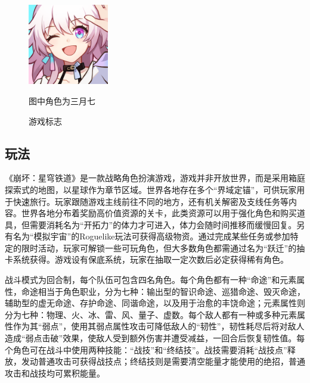 \begin{figure}
    \centering
    \includegraphics[width=100pt]{docs/imgs/HSR}


    \vspace{-8pt}
    \fontSimsun\sizeFivel 图中角色为三月七
    \vspace{-8pt}
    \caption{游戏标志}
    \label{fig:figure1}
\end{figure}

\subsection{玩法}

《崩坏：星穹铁道》是一款战略角色扮演游戏，游戏并非开放世界，而是采用箱庭探索式的地图，以星球作为章节区域。世界各地存在多个“界域定锚”，可供玩家用于快速旅行。玩家跟随游戏主线前往不同的地方，还有机关解密及支线任务等内容。世界各地分布着奖励高价值资源的关卡，此类资源可以用于强化角色和购买道具，但需要消耗名为“开拓力”的体力才可进入，体力会随时间推移而缓慢回复。另有名为“模拟宇宙”的Roguelike玩法可获得高级物资。通过完成某些任务或参加特定的限时活动，玩家可解锁一些可玩角色，但大多数角色都需通过名为“跃迁”的抽卡系统获得。游戏设有保底系统，玩家在抽取一定次数后必定获得稀有角色。

战斗模式为回合制，每个队伍可包含四名角色。每个角色都有一种“命途”和元素属性，命途相当于角色职业，分为七种：输出型的智识命途、巡猎命途、毁灭命途，辅助型的虚无命途、存护命途、同谐命途，以及用于治愈的丰饶命途；元素属性则分为七种：物理、火、冰、雷、风、量子、虚数。每个敌人都有一种或多种元素属性作为其“弱点”，使用其弱点属性攻击可降低敌人的“韧性”，韧性耗尽后将对敌人造成“弱点击破”效果，使敌人受到额外伤害并遭受减益，一回合后恢复韧性值。每个角色可在战斗中使用两种技能：“战技”和“终结技”。战技需要消耗“战技点”释放，发动普通攻击可获得战技点；终结技则是需要清空能量才能使用的绝招，普通攻击和战技均可累积能量。